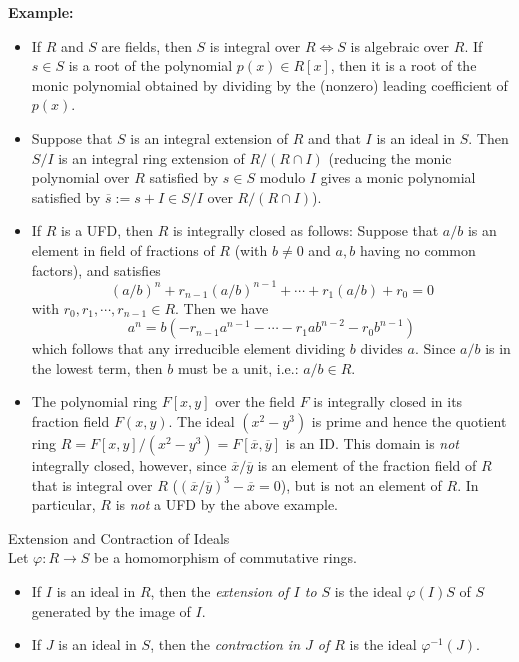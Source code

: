 \noindent\textbf{Example:} \begin{itemize}
    \item If $R$ and $S$ are fields, then $S$ is integral over $R \Leftrightarrow S$ is algebraic over $R$. If $s\in S$ is a root of the polynomial $p(x) \in R[x]$, then it is a root of the monic polynomial obtained by dividing by the (nonzero) leading coefficient of $p(x)$.

    \item Suppose that $S$ is an integral extension of $R$ and that $I$ is an ideal in $S$. Then $S/I$ is an integral ring extension of $R/(R \cap I)$ (reducing the monic polynomial over $R$ satisfied by $s\in S$ modulo $I$ gives a monic polynomial satisfied by $\overline{s}:= s+I \in S/I$ over $R/(R\cap I)$).

    \item If $R$ is a UFD, then $R$ is integrally closed as follows: Suppose that $a/b$ is an element in field of fractions of $R$ (with $b \neq 0$ and $a,b$ having no common factors), and satisfies
    $$(a/b)^n +r_{n-1}(a/b)^{n-1} +\cdots+ r_1(a/b) + r_0=0$$
    with $r_0 ,r_1, \cdots, r_{n-1} \in R$. Then we have
    $$a^n= b(-r_{n-1}a^{n-1}- \cdots- r_1ab^{n-2}- r_0b^{n-1})$$
    which follows that any irreducible element dividing $b$ divides $a$. Since $a/b$ is in the lowest term, then $b$ must be a unit, i.e.: $a/b\in R$.

    \item The polynomial ring $F[x,y]$ over the field $F$ is integrally closed in its fraction field $F(x,y)$. The ideal $(x^2-y^3)$ is prime and hence the quotient ring $R= F[x,y]/ (x^2-y^3) = F[\overline{x},\overline{y}]$ is an ID. This domain is \textit{not} integrally closed, however, since $\overline{x}/ \overline{y}$ is an element of the fraction field of $R$ that is integral over $R$ ($(\overline{x}/\overline{y})^3-\overline{x}=0$), but is not an element of $R$. In particular, $R$ is \textit{not} a UFD by the above example.
\end{itemize}

\begin{definition}{Extension and Contraction of Ideals}\\
Let $\varphi: R\to S$ be a homomorphism of commutative rings.
\begin{itemize}
    \item If $I$ is an ideal in $R$, then the \textit{extension of $I$ to $S$} is the ideal $\varphi (I)S$ of $S$ generated by the image of $I$.
    \item If $J$ is an ideal in $S$, then the \textit{contraction in $J$ of $R$} is the ideal $\varphi ^{-1}(J)$.
\end{itemize}
\end{definition}

